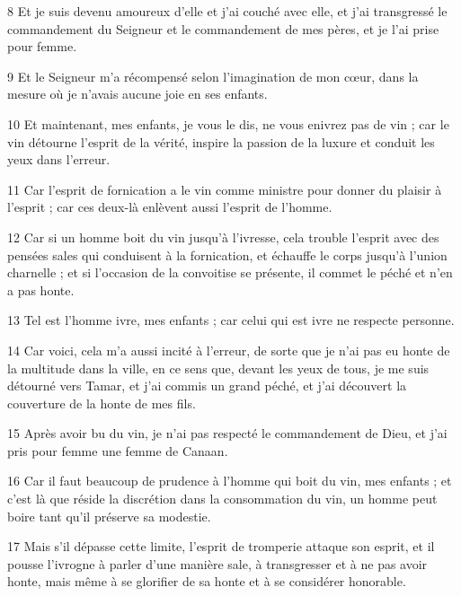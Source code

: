 \par 8 Et je suis devenu amoureux d'elle et j'ai couché avec elle, et j'ai transgressé le commandement du Seigneur et le commandement de mes pères, et je l'ai prise pour femme.

\par 9 Et le Seigneur m'a récompensé selon l'imagination de mon cœur, dans la mesure où je n'avais aucune joie en ses enfants.

\par 10 Et maintenant, mes enfants, je vous le dis, ne vous enivrez pas de vin ; car le vin détourne l'esprit de la vérité, inspire la passion de la luxure et conduit les yeux dans l'erreur.

\par 11 Car l'esprit de fornication a le vin comme ministre pour donner du plaisir à l'esprit ; car ces deux-là enlèvent aussi l'esprit de l'homme.

\par 12 Car si un homme boit du vin jusqu'à l'ivresse, cela trouble l'esprit avec des pensées sales qui conduisent à la fornication, et échauffe le corps jusqu'à l'union charnelle ; et si l'occasion de la convoitise se présente, il commet le péché et n'en a pas honte.

\par 13 Tel est l'homme ivre, mes enfants ; car celui qui est ivre ne respecte personne.

\par 14 Car voici, cela m'a aussi incité à l'erreur, de sorte que je n'ai pas eu honte de la multitude dans la ville, en ce sens que, devant les yeux de tous, je me suis détourné vers Tamar, et j'ai commis un grand péché, et j'ai découvert la couverture de la honte de mes fils.

\par 15 Après avoir bu du vin, je n'ai pas respecté le commandement de Dieu, et j'ai pris pour femme une femme de Canaan.

\par 16 Car il faut beaucoup de prudence à l'homme qui boit du vin, mes enfants ; et c'est là que réside la discrétion dans la consommation du vin, un homme peut boire tant qu'il préserve sa modestie.

\par 17 Mais s'il dépasse cette limite, l'esprit de tromperie attaque son esprit, et il pousse l'ivrogne à parler d'une manière sale, à transgresser et à ne pas avoir honte, mais même à se glorifier de sa honte et à se considérer honorable.

